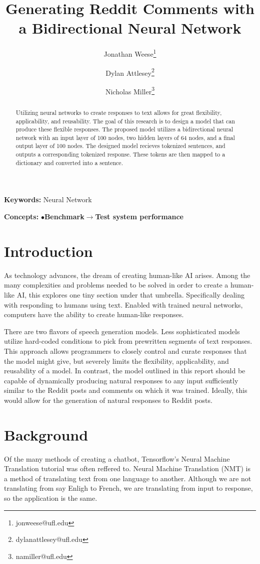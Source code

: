 \documentclass[11pt,twocolumn]{article}
\title{\textbf{Generating Reddit Comments with a Bidirectional Neural Network}}
\author{Jonathan Weese\thanks{jonweese@ufl.edu} \and Dylan Attlesey\thanks{dylanattlesey@ufl.edu} \and Nicholas Miller\thanks{namiller@ufl.edu}}
\providecommand{\keywords}[1]
{
  \textbf{Keywords:} #1
}
\providecommand{\concepts}[1]
{
  \textbf{Concepts:} #1
}
\begin{document}
\maketitle

\begin{abstract}
Utilizing neural networks to create responses to text allows for great flexibility, applicability, and reusability.  The goal of this research is to design a model that can produce these flexible responses.  The proposed model utilizes a bidirectional neural network with an input layer of 100 nodes, two hidden layers of 64 nodes, and a final output layer of 100 nodes.  The designed model recieves tokenized sentences, and outputs a corresponding tokenized response.  These tokens are then mapped to a dictionary and converted into a sentence.

\end{abstract}

\keywords{Neural Network}

\concepts{$\bullet$\textbf{Benchmark}$\rightarrow$\textbf{Test system performance}}

\section{Introduction}
As technology advances, the dream of creating human-like AI arises.  Among the many complexities and problems needed to be solved in order to create a human-like AI, this explores one tiny section under that umbrella.  Specifically dealing with responding to humans using text.  Enabled with trained neural networks, computers have the ability to create human-like responses.

There are two flavors of speech generation models. Less sophisticated models utilize hard-coded conditions to pick from prewritten segments of text responses. This approach allows programmers to closely control and curate responses that the model might give, but severely limits the flexibility, applicability, and reusability of a model. In contrast, the model outlined in this report should be capable of dynamically producing natural responses to any input sufficiently similar to the Reddit posts and comments on which it was trained. Ideally, this would allow for the generation of natural responses to Reddit posts.
\section{Background}
Of the many methods of creating a chatbot, Tensorflow's Neural Machine Translation tutorial was often reffered to.  Neural Machine Translation (NMT) is a method of translating text from one language to another.  Although we are not translating from say Enligh to French, we are translating from input to response, so the application is the same.
\end{document}
